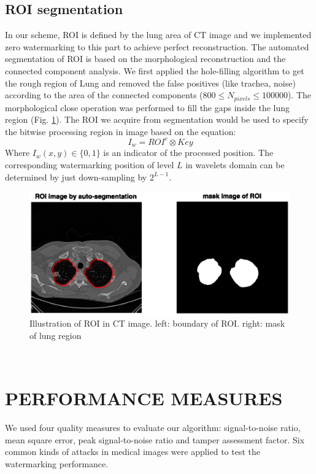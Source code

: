 \documentclass[letterpaper, 10 pt, conference]{ieeeconf}  %
\begin{document}
\subsection{ROI segmentation}
In our scheme, ROI is defined by the lung area of CT image and we implemented zero watermarking to this part to achieve perfect reconstruction. The automated segmentation of ROI is based on the morphological reconstruction and the connected component analysis. We first applied the hole-filling algorithm to get the rough region of Lung and removed the false positives (like trachea, noise) according to the area of the connected components ($800 \leq N_{pixels} \leq100000$). The morphological close operation was performed to fill the gaps inside the lung region (Fig. \ref{ROI}). The ROI we acquire from segmentation would be used to specify the bitwise processing region in image based on the equation:
\[\ I_w = ROI^c \otimes Key\]
Where $I_w(x,y)\in\{0,1\}$ is an indicator of  the processed position. The corresponding watermarking position of level $L$ in wavelets domain can be determined by just down-sampling by $2^{L-1}$.
\begin{figure}[htbp]
	\centering
	\includegraphics[width=1\linewidth]{ROI}
	\caption{Illustration of ROI in CT image. left: boundary of ROI. right: mask of lung region}
	\label{ROI}
\end{figure}
\\

\section{PERFORMANCE MEASURES}
We used four quality measures to evaluate our algorithm: signal-to-noise ratio, mean square error, peak signal-to-noise ratio and tamper assessment factor. Six common kinds of attacks in medical images were applied to test the watermarking performance.\\
\end{document}

